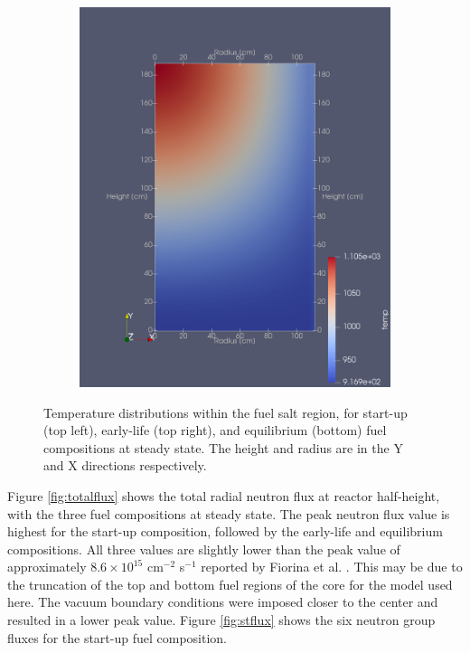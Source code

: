 \documentclass{anstrans}
\begin{document}
\begin{figure}[htbp]
\begin{subfigure}{1\columnwidth}
\end{subfigure}\hfill\\
\bigskip
\centering
\begin{subfigure}{1\columnwidth}
\includegraphics[width=\columnwidth]{./figures/eqtemp}%
\label{subfigc}%
\end{subfigure}%
\captionsetup{justification=centering}
\caption{Temperature distributions within the fuel salt region, for start-up
(top left), early-life (top right), and equilibrium (bottom) fuel compositions
at steady state. The height and radius are in the Y and X directions
respectively.}
\label{fig:temp}
\end{figure}
	
	Figure \ref{fig:totalflux} shows the total radial neutron flux at reactor
	half-height, with the three fuel compositions at steady state. 
	The peak neutron flux value is highest for the start-up composition,
	followed by the early-life and equilibrium compositions. All three values
	are slightly lower than the peak value of approximately
	$8.6 \times 10^{15}$ cm$^{-2}$ s$^{-1}$ reported by Fiorina et al.
	\cite{fiorina_investigation_2013}. This may be due to the truncation of
	the top and bottom fuel regions of the core for the model used here.
	The vacuum boundary conditions were imposed closer to the center and
	resulted in a lower peak value. Figure \ref{fig:stflux} shows the six
	neutron group fluxes for the start-up fuel composition.
	
\end{document}

